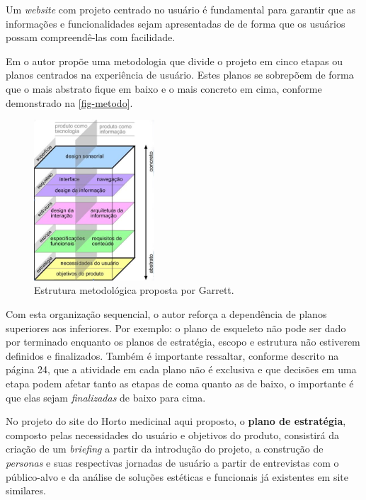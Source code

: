 Um \emph{website} com projeto centrado no usuário é fundamental para garantir que as informações e funcionalidades sejam apresentadas de de forma que os usuários possam compreendê-las com facilidade.

Em \textcite{garret02} o autor propõe uma metodologia que divide o projeto em cinco etapas ou planos centrados na experiência de usuário. Estes planos se sobrepõem de forma que o mais abstrato fique em baixo e o mais concreto em cima, conforme demonstrado na \autoref{fig-metodo}.

\begin{figure}[!htbp]
\centering
\caption{\label{fig-metodo}Estrutura metodológica proposta por Garrett.}
\includegraphics[width=0.4\textwidth]{images/drive/image_6.jpg}
\end{figure}


Com esta organização sequencial, o autor reforça a dependência de planos superiores aos inferiores. Por exemplo: o plano de esqueleto não pode ser dado por terminado enquanto os planos de estratégia, escopo e estrutura não estiverem definidos e finalizados. Também é importante ressaltar, conforme descrito na página 24, que a atividade em cada plano não é exclusiva e que decisões em uma etapa podem afetar tanto as etapas de coma quanto as de baixo, o importante é que elas sejam \emph{finalizadas} de baixo para cima.

No projeto do site do Horto medicinal aqui proposto, o \textbf{plano de estratégia}, composto pelas necessidades do usuário e objetivos do produto, consistirá da criação de um \emph{briefing} a partir da introdução do projeto, a construção de \emph{personas} e suas respectivas jornadas de usuário a partir de entrevistas com o público-alvo e da análise de soluções estéticas e funcionais já existentes em site similares.

